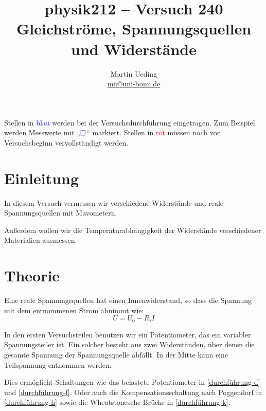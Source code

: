 \documentclass[11pt, ngerman]{article}
\title{physik212 -- Versuch 240 \\ Gleichströme, Spannungsquellen und Widerstände}
\author{Martin Ueding \\ {\small \href{mailto:mu@uni-bonn.de}{mu@uni-bonn.de}}}
\newcommand{\messwert}{\textcolor{blue}{\square}}
\begin{document}
\maketitle

\tableofcontents

\vfill

\begin{small}
	Stellen in \textcolor{blue}{blau} werden bei der Versuchsdurchführung
	eingetragen. Zum Beispiel werden Messwerte mit „$\messwert$“ markiert.
	Stellen in \textcolor{red}{rot} müssen noch vor Versuchsbeginn
	vervollständigt werden.
\end{small}

\newpage


\section{Einleitung}

In diesem Versuch vermessen wir verschiedene Widerstände und reale
Spannungsquellen mit Mavometern.

Außerdem wollen wir die Temperaturabhängigkeit der Widerstände verschiedener
Materialien ausmessen.


\section{Theorie}

Eine reale Spannungsquellen hat einen Innenwiderstand, so dass die Spannung mit
dem entnommenen Strom abnimmt wie:
\[ U = U_0 - R_i I \]

In den ersten Versuchsteilen benutzen wir ein Potentiometer, das ein variabler
Spannungsteiler ist. Ein solcher besteht aus zwei Widerständen, über denen die
gesamte Spannung der Spannungsquelle abfällt. In der Mitte kann eine
Teilspannung entnommen werden.

Dies ermöglicht Schaltungen wie das belastete Potentiometer in
\ref{durchführung-d} und \ref{durchführung-f}. Oder auch die
Kompensationsschaltung nach Poggendorf in \ref{durchführung-h} sowie die
Wheatstonesche Brücke in \ref{durchführung-k}.
\end{document}
